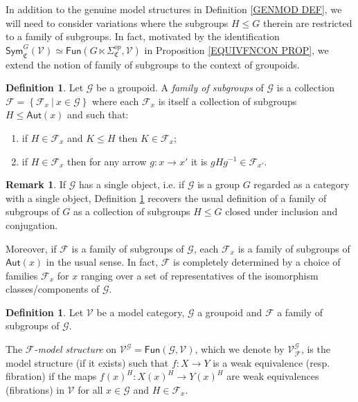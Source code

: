 \documentclass[a4paper,10pt
,draft
]{article}%
\numberwithin{equation}{section}
\numberwithin{figure}{section}
\theoremstyle{definition} %
\newtheorem{definition}[equation]{Definition}%
\newtheorem{remark}[equation]{Remark}%
\newcommand{\Fun}{\mathsf{Fun}}
\newcommand{\F}{\ensuremath{\mathcal F}}
\newcommand{\V}{\ensuremath{\mathcal V}}
\newcommand{\G}{\ensuremath{\mathcal G}}
\newcommand{\1}{\ensuremath{\mathbbm 1}}%
\begin{document}
In addition to the genuine model structures in 
Definition \ref{GENMOD DEF},
we will need to consider variations
where the subgroups $H\leq G$ therein are restricted to a family of subgroups.
In fact, motivated by the identification
$\mathsf{Sym}^G_{\mathfrak{C}}(\V) \simeq 
\mathsf{Fun}(G \ltimes \Sigma^{op}_{\mathfrak{C}},\V)$
in Proposition \ref{EQUIVFNCON PROP},
we extend the notion of family of subgroups to the context of groupoids.


\begin{definition}\label{FAMGROUPOID DEF}
Let $\G$ be a groupoid.
A \textit{family of subgroups} of $\G$
is a collection 
$\mathcal{F} = \left\{\mathcal{F}_x\ | \ x\in \G\right\}$
where each $\F_x$ is itself a collection of subgroups
$H \leq \mathsf{Aut}(x)$ and such that:
\begin{enumerate}[label = (\roman*)]
\item if $H \in \F_x$ and $K \leq H$ then $K \in \mathcal{F}_x$;
\item if $H \in \mathcal{F}_x$
then for any arrow $g \colon x \to x'$
it is $g H g^{-1} \in \mathcal{F}_{x'}$.
\end{enumerate}
\end{definition}


\begin{remark}
If $\G$ has a single object, i.e. if $\G$ is a group $G$ regarded as a category with a single object, Definition \ref{FAMGROUPOID DEF} recovers the usual definition of a family of subgroups of $G$ as a collection of subgroups $H\leq G$ closed under inclusion and conjugation.

Moreover, if $\F$ is a family of subgroups of $\G$, each $\F_x$ is a family of subgroups of $\mathsf{Aut}(x)$ in the usual sense. 
In fact, $\mathcal{F}$ is completely determined by a choice of families
$\F_x$ for $x$ ranging over a set of representatives of the isomorphism classes/components of $\G$.
\end{remark}



\begin{definition}
	Let $\V$ be a model category, $\G$ a groupoid and 
	$\F$ a family of subgroups of $\G$.

	The \textit{$\F$-model structure} on $\V^\G = \Fun(\G, \V)$, 
	which we denote by $\V^\G_\F$,
	is the model structure (if it exists)
	such that 
	$f\colon X \to Y$
	is a weak equivalence (resp. fibration)
	if the maps $f(x)^H \colon X(x)^H \to Y(x)^H$ are weak equivalences (fibrations) in $\V$ for all $x \in \G$ and $H \in \F_x$.
\end{definition}
\end{document}
